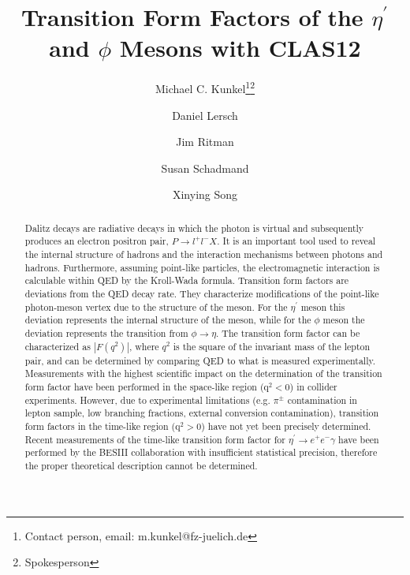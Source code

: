 \documentclass[11pt,a4paper]{article}
\title{Transition Form Factors of the $\eta^{\prime}$ and $\phi$ Mesons with CLAS12}
\date{}
\author[1]{Michael C. Kunkel\thanks{Contact person, email: m.kunkel@fz-juelich.de}\thanks{Spokesperson}}
\author[1]{Daniel Lersch}
\author[1]{Jim Ritman\samethanks}
\author[1]{Susan Schadmand\samethanks}
\author[1]{Xinying Song}
\affil[1]{Forschungszentrum J\"ulich, J\"ulich (Germany)}
\def\etaP{\eta^{\prime}}
\begin{document}
\maketitle
\thispagestyle{firststyle}
\begin{abstract}
	Dalitz decays are radiative decays in which the photon is virtual and subsequently produces an electron positron pair, $P\rightarrow l^+l^-X$. It is an important tool used to reveal the internal structure of hadrons and the interaction mechanisms between photons and hadrons. Furthermore, assuming point-like particles, the electromagnetic interaction is calculable within QED by the Kroll-Wada formula. Transition form factors are deviations from the QED decay rate. They characterize modifications of the point-like photon-meson vertex due to the structure of the meson. For the $\etaP$ meson this deviation represents the internal structure of the meson, while for the $\phi$ meson the deviation represents the transition from $\phi \to \eta$. The transition form factor can be characterized as $\left| F(q^2)\right|$, where $q^2$ is the square of the invariant mass of the lepton pair, and can be determined by comparing QED to what is measured experimentally.
	\\ 
	\indent Measurements with the highest scientific impact on the determination of the transition form factor have been performed in the space-like region ($\mathrm{q}^2<0$) in collider experiments. However, due to experimental limitations (e.g. $\pi^{\pm}$ contamination in lepton sample, low branching fractions, external conversion contamination), transition form factors in the time-like region ($\mathrm{q}^2>0$) have not yet been precisely determined. Recent measurements of the time-like transition form factor for $\etaP \to e^+e^- \gamma$ have been performed by the BESIII collaboration with insufficient statistical precision, therefore the proper theoretical description cannot be determined. 
	\\

\end{abstract}
\end{document}
